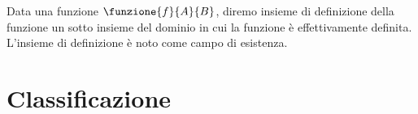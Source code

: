 \begin{defn}\label{defn:funzione-insieme-di}
Data una funzione $\funzione{f}{A}{B}$, diremo insieme di definizione della funzione un sotto insieme del dominio in cui la funzione è effettivamente definita. L'insieme di definizione è noto come campo di esistenza.
\end{defn}
{\centering
	
	\par}
\section{Classificazione}\label{sec:classificazione}
{\centering
	
	\par}
